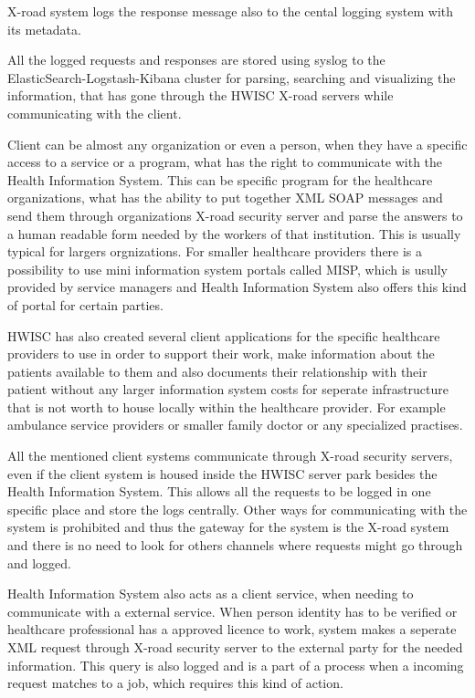 \documentclass[a4paper, 12pt]{article}
\begin{document}
X-road system logs the response message also to the cental logging system with its metadata. 

All the logged requests and responses are stored using syslog to the ElasticSearch-Logstash-Kibana cluster for parsing, searching and visualizing the information, that has gone through the HWISC X-road servers while communicating with the client. 

Client can be almost any organization or even a person, when they have a specific access to a service or a program, what has the right to communicate with the Health Information System. This can be specific program for the healthcare organizations, what has the ability to put together XML SOAP messages and send them through organizations X-road security server and parse the answers to a human readable form needed by the workers of that institution. 
This is usually typical for largers orgnizations. For smaller healthcare providers there is a possibility to use mini information system portals called MISP, which is usully provided by service managers and Health Information System also offers this kind of portal for certain parties. 

HWISC has also created several client applications for the specific healthcare providers to use in order to support their work, make information about the patients available to them and also documents their relationship with their patient without any larger information system costs for seperate infrastructure that is not worth to house locally within the healthcare provider. For example ambulance service providers or smaller family doctor or any specialized practises. 

All the mentioned client systems communicate through X-road security servers, even if the client system is housed inside the HWISC server park besides the Health Information System. This allows all the requests to be logged in one specific place and store the logs centrally. Other ways for communicating with the system is prohibited and thus the gateway for the system is the X-road system and there is no need to look for others channels where requests might go through and logged. 

Health Information System also acts as a client service, when needing to communicate with a external service. When person identity has to be verified or healthcare professional has a approved licence to work, system makes a seperate XML request through X-road security server to the external party for the needed information. This query is also logged and is a part of a process when a incoming request matches to a job, which requires this kind of action. 
\end{document}
